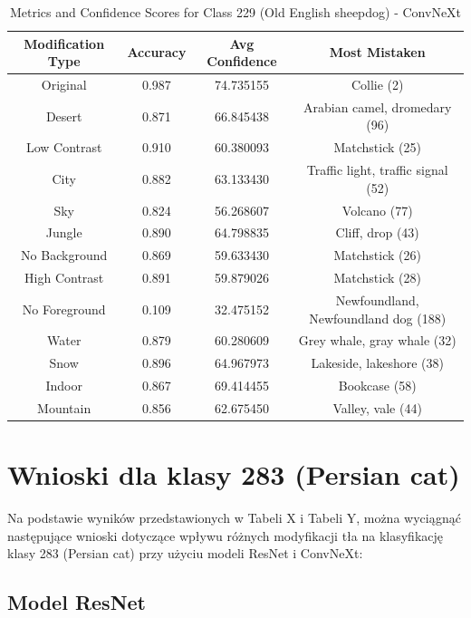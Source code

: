 \begin{table}
	\centering
	\begin{tabular}{|c|c|c|c|}
		\hline
		\textbf{Modification Type} & \textbf{Accuracy} & \textbf{Avg Confidence} & \textbf{Most Mistaken} \\
		\hline
		Original & 0.987 & 74.735155 & Collie (2) \\
		\hline
		Desert & 0.871 & 66.845438 & Arabian camel, dromedary (96) \\
		\hline
		Low Contrast & 0.910 & 60.380093 & Matchstick (25) \\
		\hline
		City & 0.882 & 63.133430 & Traffic light, traffic signal (52) \\
		\hline
		Sky & 0.824 & 56.268607 & Volcano (77) \\
		\hline
		Jungle & 0.890 & 64.798835 & Cliff, drop (43) \\
		\hline
		No Background & 0.869 & 59.633430 & Matchstick (26) \\
		\hline
		High Contrast & 0.891 & 59.879026 & Matchstick (28) \\
		\hline
		No Foreground & 0.109 & 32.475152 & Newfoundland, Newfoundland dog (188) \\
		\hline
		Water & 0.879 & 60.280609 & Grey whale, gray whale (32) \\
		\hline
		Snow & 0.896 & 64.967973 & Lakeside, lakeshore (38) \\
		\hline
		Indoor & 0.867 & 69.414455 & Bookcase (58) \\
		\hline
		Mountain & 0.856 & 62.675450 & Valley, vale (44) \\
		\hline
	\end{tabular}
	\caption{Metrics and Confidence Scores for Class 229 (Old English sheepdog) - ConvNeXt}
	\label{tab:metrics_confidence_class_229_convnext}
\end{table}

\section*{Wnioski dla klasy 283 (Persian cat)}

Na podstawie wyników przedstawionych w Tabeli X i Tabeli Y, można wyciągnąć następujące wnioski dotyczące wpływu różnych modyfikacji tła na klasyfikację klasy 283 (Persian cat) przy użyciu modeli ResNet i ConvNeXt:

\subsection*{Model ResNet}


